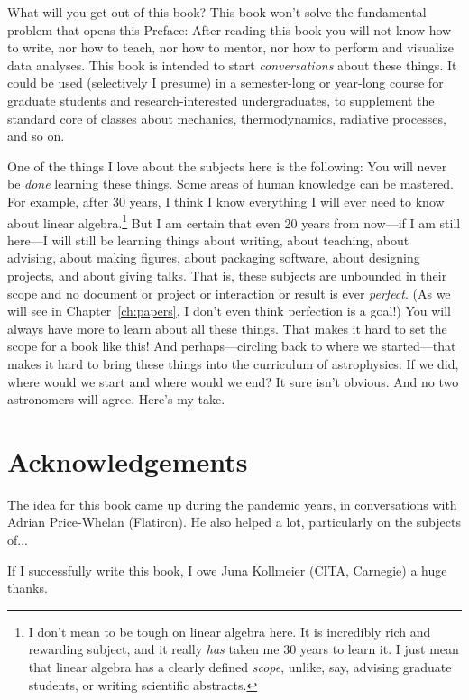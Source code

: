 \documentclass[letterpaper]{book}
\newcommand{\chaptermarkstar}[1]{\markboth{#1}{#1}}
\begin{document}
What will you get out of this book?
This book won't solve the fundamental problem that opens this Preface: 
After reading this book you will not know how to write, nor how to teach, nor how to mentor, nor how to perform and visualize data analyses.
This book is intended to start \emph{conversations} about these things.
It could be used (selectively I presume) in a semester-long or year-long course for graduate students and research-interested undergraduates, to supplement the standard core of classes about mechanics, thermodynamics, radiative processes, and so on.

One of the things I love about the subjects here is the following:
You will never be \emph{done} learning these things.
Some areas of human knowledge can be mastered.
For example, after 30 years, I think I know everything I will ever need to know about linear algebra.\footnote{I don't mean to be tough on linear algebra here. It is incredibly rich and rewarding subject, and it really \emph{has} taken me 30 years to learn it. I just mean that linear algebra has a clearly defined \emph{scope}, unlike, say, advising graduate students, or writing scientific abstracts.}
But I am certain that even 20 years from now---if I am still here---I will still be learning things about writing, about teaching, about advising, about making figures, about packaging software, about designing projects, and about giving talks.
That is, these subjects are unbounded in their scope and no document or project or interaction or result is ever \emph{perfect}.
(As we will see in Chapter~\ref{ch:papers}, I don't even think perfection is a goal!)
You will always have more to learn about all these things.
That makes it hard to set the scope for a book like this!
And perhaps---circling back to where we started---that makes it hard to bring these things into the curriculum of astrophysics: If we did, where would we start and where would we end?
It sure isn't obvious. And no two astronomers will agree. Here's my take.

\chapter*{Acknowledgements}%
\chaptermarkstar{Acknowledgements}

The idea for this book came up during the pandemic years, in conversations with Adrian Price-Whelan (Flatiron). He also helped a lot, particularly on the subjects of...

If I successfully write this book, I owe Juna Kollmeier (CITA, Carnegie) a huge thanks.
\end{document}
